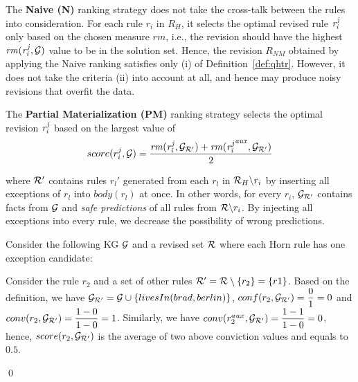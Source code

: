 The \textbf{Naive (N)} ranking strategy does not take the cross-talk between the rules into consideration. For each rule $r_i$ in $R_H$, it selects the optimal revised rule $\mathit{r^j_i}$ only based on the chosen measure $rm$, i.e., the revision should have the highest $\mathit{rm(r^j_{i},\mathcal{G})}$ value to be in the solution set. Hence, the revision $R_{NM}$ obtained by applying the Naive ranking satisfies only (i) of Definition~\ref{def:qhtr}. However, it does not take the criteria (ii) into account at all, and hence may produce noisy revisions that overfit the data.

The \textbf{Partial Materialization (PM)} ranking strategy selects the optimal revision $\mathit{r^j_i}$ based on the largest value of
\begin{equation}
\label{pm}
score(r^j_i,\mathcal{G})=\dfrac{\mathit{rm(r^j_i,\mathcal{G}_{\mathcal{R}'})+rm({r^j_i}^{aux},\mathcal{G}_{\mathcal{R}'})}}{2}
\end{equation}

where $\mathcal{R}'$ contains rules $r_l'$ generated from each $r_l$ in $\mathcal{R}_H\backslash r_i$ by inserting all exceptions of $r_l$ into $body(r_l)$ at once. In other words, for every $r_i$, $\mathcal{G}_{\mathcal{R}'}$ contains facts from $\mathcal{G}$ and \textit{safe predictions} of all rules from $\mathcal{R} \backslash r_i$. By injecting all exceptions into every rule, we decrease the possibility of wrong predictions.

\begin{example}\label{ex:as}
Consider the following KG $\mathcal{G}$ and a revised set $\mathcal{R}$ where each Horn rule has one exception candidate:\\
{\small {}}
{\small {}}            
\normalsize
{\smallskip

\noindent            

Consider the rule $r_2$ and a set of other rules $\mathcal{R}' = \mathcal{R} \setminus \{r_2\} = \{r1\}$. Based on the definition, we have $\mathcal{G}_{\mathcal{R}'} = \mathcal{G} \cup \{livesIn(brad,berlin)\}$, $conf(r_2, \mathcal{G}_{\mathcal{R}'}) = \dfrac{0}{1} = 0$ and $conv(r_2, \mathcal{G}_{\mathcal{R}'}) = \dfrac{1 - 0}{1 - 0} = 1$. Similarly, we have $conv(r_2^{aux}, \mathcal{G}_{\mathcal{R}'}) = \dfrac{1 - 1}{1 - 0} = 0$, hence, $score(r_2, \mathcal{G}_{\mathcal{R}'})$ is the average of two above conviction values and equals to $0.5$.
}\qed
\end{example}

